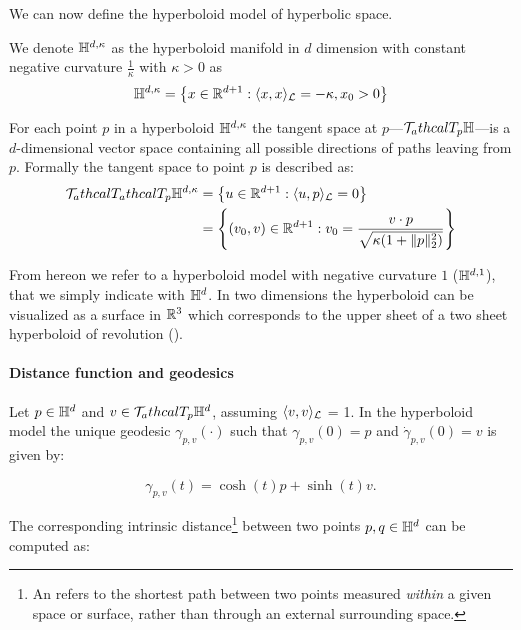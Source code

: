 We can now define the hyperboloid model of hyperbolic space.
\begin{definition}
    We denote $\mathbb{H}^{d,\kappa}$ as the hyperboloid manifold in $d$ dimension with constant negative curvature $\frac{1}{\kappa}$ with $\kappa>0$ as
    \begin{equation*}
        \mathbb{H}^{d,\kappa} = \left\{x \in \mathbb{R}^{d+1} : \langle x, x \rangle_{\mathcal{L}} = -\kappa, x_0 > 0\right\}
    \end{equation*}
\end{definition}



For each point $p$ in a hyperboloid $\mathbb{H}^{d,\kappa}$ the tangent space at $p$---$\mathcal{T}_athcal{T}_p\mathbb{H}$---is a $d$-dimensional vector space containing all possible directions of paths leaving from $p$. Formally the tangent space to point $p$ is described as:
\begin{align*}
    \mathcal{T}_athcal{T}_athcal{T}_p\mathbb{H}^{d,\kappa} 
    &= \left\{u\in \mathbb{R}^{d+1} : \langle u, p \rangle_{\mathcal{L}} = 0\right\} \\
    &= \left\{(v_0,v) \in \mathbb{R}^{d+1} : v_0 = \frac{v \cdot p}{\sqrt{\kappa(1 + \|p\|^2_2)}}\right\}
\end{align*}

From hereon we refer to a hyperboloid model with negative curvature $1$ ($\mathbb{H}^{d,1}$), that we simply indicate with $\mathbb{H}^d$. In two dimensions the hyperboloid can be visualized as a surface in $\mathbb{R}^3$ which corresponds to the upper sheet of a two sheet hyperboloid of revolution ().

\paragraph{Distance function and geodesics}
Let $p\in\mathbb{H}^d$ and $v\in \mathcal{T}_athcal{T}_p\mathbb{H}^d$, assuming $\langle v,v\rangle_{\mathcal{L}} $ = 1. In the hyperboloid model the unique geodesic $\gamma_{p,v}(\cdot)$ such that $\gamma_{p,v}(0)=p$ and $\dot{\gamma}_{p,v}(0)=v$ is given by:

\begin{equation*}
    \gamma_{p,v}(t) = \cosh(t)p + \sinh(t)v.
\end{equation*}

The corresponding intrinsic distance\footnote{An  refers to the shortest path between two points measured \emph{within} a given space or surface, rather than through an external surrounding space.} between two points $p,q\in\mathbb{H}^d$ can be computed as:

